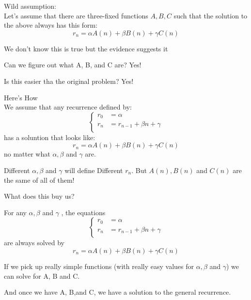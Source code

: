 Wild assumption: \\
Let's assume that there are three-fixed
functions $ A, B, C $  such that the solution to 
the above always has this form:
\begin{equation*}
    r_n = \alpha A(n) + \beta B(n) + \gamma C(n)
\end{equation*}

We don't know this is true but the evidence suggests it

Can we figure out what A, B, and C are? Yes!

Is this easier tha the original problem? Yes!

Here's How\\
We assume that any recurrence defined by:
\begin{equation*}
    \left\{
        \begin{array}{ll}
            r_0 &= \alpha\\
            r_n &= r_{n-1}+\beta n+\gamma\\
        \end{array}
    \right.
\end{equation*}
has a soluntion that looks like:
\begin{equation*}
    r_n = \alpha A(n) + \beta B(n) + \gamma C(n)
\end{equation*}
no matter what $ \alpha, \beta $ and $ \gamma $ are.

Different $ \alpha, \beta $ and $ \gamma $ will define Different $ r_n $. But $ A(n), B(n) $ and $ C(n) $ are the same of all of them!

What does this buy us?

For any $ \alpha, \beta $ and $ \gamma $ , the equations
\begin{equation*}
    \left\{
        \begin{array}{ll}
            r_0 &= \alpha\\
            r_n &= r_{n-1}+\beta n+\gamma\\
        \end{array}
    \right.
\end{equation*}
are always solved by
\begin{equation*}
    r_n = \alpha A(n) + \beta B(n) + \gamma C(n)
\end{equation*}

If we pick up really simple functions (with really easy values for  $ \alpha, \beta $ and $ \gamma $) we can solve for A, B and C.

And once we have A, B,and C, we have a solution to the general recurrence.


